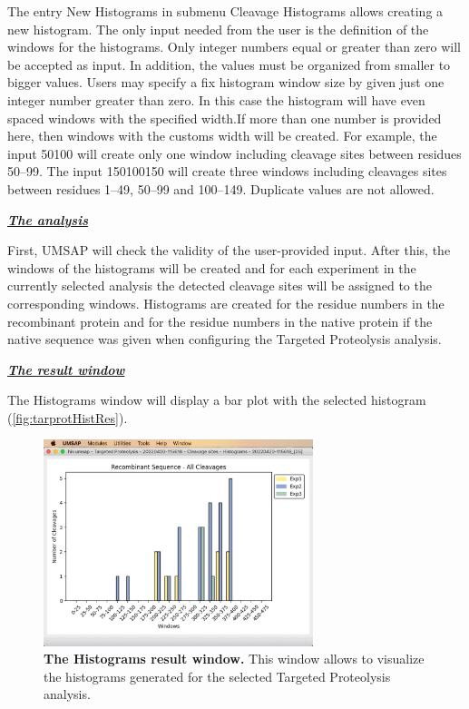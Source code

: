 The entry New Histograms in submenu Cleavage Histograms allows creating a new histogram.
The only input needed from the user is the definition of the windows for the histograms.
Only integer numbers equal or greater than zero will be accepted as input. In addition,
the values must be organized from smaller to bigger values. Users may specify a fix
histogram window size by given just one integer number greater than zero. In this
case the histogram will have even spaced windows with the specified width.If more
than one number is provided here, then windows with the customs width will be created.
For example, the input \numlist{50 100} will create only one window
including cleavage sites between residues \numrange{50}{99}. The input
\numlist{1 50 100 150} will create three windows including cleavages sites between
residues \numrange{1}{49}, \numrange{50}{99} and \numrange{100}{149}. Duplicate values
are not allowed.

\textit{\textbf{\underline{The analysis}}}

First, UMSAP will check the validity of the user-provided input. After this, the
windows of the histograms will be created and for each experiment in the currently
selected analysis the detected cleavage sites will be assigned to the corresponding
windows. Histograms are created for the residue numbers in the recombinant protein
and for the residue numbers in the native protein if the native sequence was given
when configuring the Targeted Proteolysis analysis.

\textit{\textbf{\underline{The result window}}}

The Histograms window will display a bar plot with the selected histogram 
(\autoref{fig:tarprotHistRes}).

\begin{figure}[h]
    \centering
    \includegraphics[width=0.7\textwidth]{./IMAGES/MOD-TARPROT/tarprot-hist.jpg}
    \caption[The Histograms result window]{\textbf{The Histograms result window.}
    This window allows to visualize the histograms generated for the selected Targeted
    Proteolysis analysis.}
    \label{fig:tarprotHistRes}
    \vspace{-5pt}
\end{figure}

